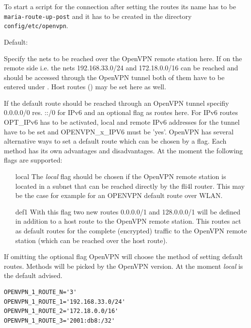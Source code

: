 \begin{description}
  To start a script for the connection 
  after setting the routes its name has to be \texttt{maria-route-up-post}
  and it has to be created in the directory \texttt{config/etc/openvpn}.


  Default: 

  Specify the nets to be reached over the OpenVPN remote station here.
  If on the remote side i.e. the nets 192.168.33.0/24 and 172.18.0.0/16 
  can be reached and should be accessed through the OpenVPN tunnel both 
  of them have to be entered under . 
  Host routes () may be set here as well.

  If the default route should be reached through an OpenVPN tunnel specifiy 
  0.0.0.0/0 res. ::/0 for IPv6 and an optional flag as routes here. 
  For IPv6 routes OPT\_IPv6 has to be activated, local and remote IPv6 
  addresses for the tunnel have to be set and OPENVPN\_x\_IPV6 
  must be 'yes'. OpenVPN has several alternative ways to set a default route
  which can be chosen by a flag. Each method has its own advantages and 
  disadvantages. At the moment the following flags are supported:

\begin{itemize}
\item [local] The \emph{local} flag should be chosen if the OpenVPN 
	      remote station is located in a subnet that can be reached 
	      directly by the fli4l router. This may be the case for example 
	      for an OPENVPN default route over WLAN.
\item [def1] With this flag two new routes 0.0.0.0/1 and 128.0.0.0/1 will 
	     be defined in addition to a host route to the OpenVPN remote 
	     station. This routes act as default routes for the complete 
	     (encrypted) traffic to the OpenVPN remote station (which can 
	     be reached over the host route).
\end{itemize}

  If omitting the optional flag OpenVPN will choose the method of setting 
  default routes. Methods will be picked by the OpenVPN version. At the moment 
  \emph{local} is the default advised.

\begin{example}
\begin{verbatim}
OPENVPN_1_ROUTE_N='3'
OPENVPN_1_ROUTE_1='192.168.33.0/24'
OPENVPN_1_ROUTE_2='172.18.0.0/16'
OPENVPN_1_ROUTE_3='2001:db8:/32'
\end{verbatim}
\end{example}

\end{description}

